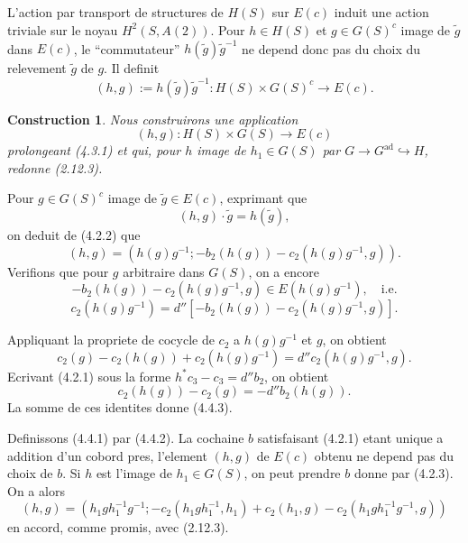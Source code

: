 \documentclass[11pt,a4paper]{article}
\theoremstyle{plain}
\newtheorem{construction}[theorem]{Construction}
\theoremstyle{definition}
\DeclareMathOperator{\ad}{ad}
\begin{document}
\subsection{}\label{4.3}

L'action par transport de structures de $H(S)$ sur $E(c)$ induit une action triviale sur le noyau $H^2(S, A(2))$. Pour $h \in H(S)$ et $g \in G(S)^c$ image de $\tilde{g}$ dans $E(c)$, le ``commutateur'' $h(\tilde{g}) \tilde{g}^{-1}$ ne depend donc pas du choix du relevement $\tilde{g}$ de $g$. Il definit
\begin{equation}\label{4.3.1}
(h, g) := h(\tilde{g}) \tilde{g}^{-1} : H(S) \times G(S)^c \to E(c).
\end{equation}

\begin{construction}\label{4.4}
Nous construirons une application
\begin{equation}\label{4.4.1}
(h, g) : H(S) \times G(S) \to E(c)
\end{equation}
prolongeant (4.3.1) et qui, pour $h$ image de $h_1 \in G(S)$ par $G \to G^{\ad} \hookrightarrow H$, redonne (2.12.3).
\end{construction}

Pour $g \in G(S)^c$ image de $\tilde{g} \in E(c)$, exprimant que
\[
(h, g) \cdot \tilde{g} = h(\tilde{g}),
\]
on deduit de (4.2.2) que
\begin{equation}\label{4.4.2}
(h, g) = (h(g) g^{-1}; -b_2(h(g)) - c_2(h(g) g^{-1}, g)).
\end{equation}
Verifions que pour $g$ arbitraire dans $G(S)$, on a encore
\[
-b_2(h(g)) - c_2(h(g) g^{-1}, g) \in E(h(g) g^{-1}), \quad \text{i.e.}
\]
\begin{equation}\label{4.4.3}
c_2(h(g) g^{-1}) = d''[-b_2(h(g)) - c_2(h(g) g^{-1}, g)].
\end{equation}

Appliquant la propriete de cocycle de $c_2$ a $h(g) g^{-1}$ et $g$, on obtient
\[
c_2(g) - c_2(h(g)) + c_2(h(g) g^{-1}) = d'' c_2(h(g) g^{-1}, g).
\]
Ecrivant (4.2.1) sous la forme $h^* c_3 - c_3 = d'' b_2$, on obtient
\[
c_2(h(g)) - c_2(g) = -d'' b_2(h(g)).
\]
La somme de ces identites donne (4.4.3).

Definissons (4.4.1) par (4.4.2). La cochaine $b$ satisfaisant (4.2.1) etant unique a addition d'un cobord pres, l'element $(h, g)$ de $E(c)$ obtenu ne depend pas du choix de $b$. Si $h$ est l'image de $h_1 \in G(S)$, on peut prendre $b$ donne par (4.2.3). On a alors
\[
(h, g) = (h_1 g h_1^{-1} g^{-1}; -c_2(h_1 g h_1^{-1}, h_1) + c_2(h_1, g) - c_2(h_1 g h_1^{-1} g^{-1}, g))
\]
en accord, comme promis, avec (2.12.3).
\end{document}
